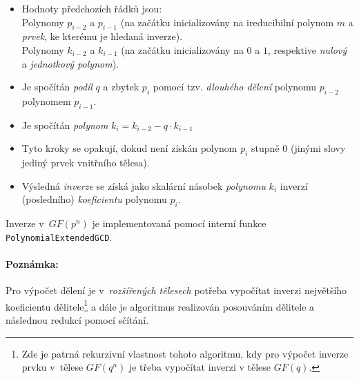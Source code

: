 \documentclass[thesis=M,czech,hidelinks]{FITthesis}[2012/06/26]
\newcommand{\0}{{\textcolor[gray]{0.80}{0}}}
\begin{document}
\begin{itemize}
    \item Hodnoty předchozích řádků jsou:\\
        \hspace*{0.6cm}Polynomy $p_{i-2}$ a $p_{i-1}$ (na začátku inicializovány
            na ireducibilní polynom $m$ a \emph{prvek}, ke kterému je hledaná
            inverze). \\
        \hspace*{0.6cm}Polynomy $k_{i-2}$ a $k_{i-1}$ (na začátku inicializovány
            na $0$ a $1$, respektive \emph{nulový} a \emph{jednotkový
            polynom}).

    \item Je spočítán \emph{podíl} $q$ a zbytek $p_i$ pomocí tzv. \emph{dlouhého
        dělení} polynomu $p_{i-2}$ polynomem $p_{i-1}$.

    \item Je spočítán \emph{polynom} $k_i = k_{i-2} - q \cdot k_{i-1} $

    \item Tyto kroky se opakují, dokud není získán polynom $p_i$ stupně $0$
        (jinými slovy jediný prvek vnitřního tělesa).

    \item Výsledná \emph{inverze} se získá jako skalární násobek \emph{polynomu}
        $k_i$ inverzí (posledního) \emph{koeficientu} polynomu $p_i$.
\end{itemize}

Inverze v~$GF(p^n)$ je implementovaná pomocí interní funkce
\texttt{Polynomial\-ExtendedGCD}.

\paragraph{Poznámka:} Pro výpočet dělení je v~\emph{rozšířených tělesech}
potřeba vypočítat inverzi největšího koeficientu dělitele\footnote{
    Zde je patrná rekurzivní vlastnost tohoto algoritmu, kdy pro výpočet inverze
    prvku v~tělese $GF(q^n)$ je třeba vypočítat inverzi v tělese $GF(q)$.
} a dále je algoritmus realizován posouváním dělitele a následnou redukcí pomocí
sčítání.
\end{document}
